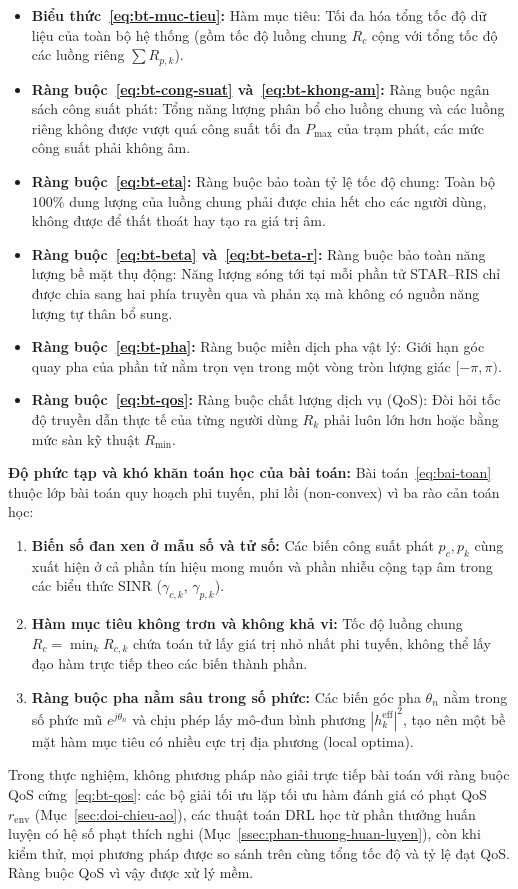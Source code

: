 \begin{itemize}
\item \textbf{Biểu thức~\eqref{eq:bt-muc-tieu}:} Hàm mục tiêu: Tối đa hóa tổng tốc độ dữ liệu của toàn bộ hệ
  thống (gồm tốc độ luồng chung $R_c$ cộng với tổng tốc độ các luồng riêng $\sum R_{p,k}$).
\item \textbf{Ràng buộc~\eqref{eq:bt-cong-suat} và~\eqref{eq:bt-khong-am}:} Ràng buộc ngân sách công suất
  phát: Tổng năng lượng phân bổ cho luồng chung và các luồng riêng không được vượt quá công suất tối đa
  $P_{\max}$ của trạm phát, các mức công suất phải không âm.
\item \textbf{Ràng buộc~\eqref{eq:bt-eta}:} Ràng buộc bảo toàn tỷ lệ tốc độ chung: Toàn bộ $100\%$ dung lượng
  của luồng chung phải được chia hết cho các người dùng, không được để thất thoát hay tạo ra giá trị âm.
\item \textbf{Ràng buộc~\eqref{eq:bt-beta} và~\eqref{eq:bt-beta-r}:} Ràng buộc bảo toàn năng lượng bề mặt
  thụ động: Năng lượng sóng tới tại mỗi phần tử STAR--RIS chỉ được chia sang hai phía truyền qua và phản xạ mà
  không có nguồn năng lượng tự thân bổ sung.
\item \textbf{Ràng buộc~\eqref{eq:bt-pha}:} Ràng buộc miền dịch pha vật lý: Giới hạn góc quay pha của phần tử
  nằm trọn vẹn trong một vòng tròn lượng giác $[-\pi, \pi)$.
\item \textbf{Ràng buộc~\eqref{eq:bt-qos}:} Ràng buộc chất lượng dịch vụ (QoS): Đòi hỏi tốc độ truyền dẫn
  thực tế của từng người dùng $R_k$ phải luôn lớn hơn hoặc bằng mức sàn kỹ thuật $R_{\min}$.
\end{itemize}

\textbf{Độ phức tạp và khó khăn toán học của bài toán:} Bài toán~\eqref{eq:bai-toan} thuộc lớp bài toán quy
hoạch phi tuyến, phi lồi (non-convex) vì ba rào cản toán học:
\begin{enumerate}
\item \textbf{Biến số đan xen ở mẫu số và tử số:} Các biến công suất phát $p_c, p_k$ cùng xuất hiện ở cả phần
  tín hiệu mong muốn và phần nhiễu cộng tạp âm trong các biểu thức SINR ($\gamma_{c,k}$, $\gamma_{p,k}$).
\item \textbf{Hàm mục tiêu không trơn và không khả vi:} Tốc độ luồng chung $R_c = \min_k R_{c,k}$ chứa toán tử
  lấy giá trị nhỏ nhất phi tuyến, không thể lấy đạo hàm trực tiếp theo các biến thành phần.
\item \textbf{Ràng buộc pha nằm sâu trong số phức:} Các biến góc pha $\theta_n$ nằm trong số phức mũ
  $e^{j\theta_n}$ và chịu phép lấy mô-đun bình phương $|h^{\mathrm{eff}}_k|^2$, tạo nên một bề mặt hàm mục
  tiêu có nhiều cực trị địa phương (local optima).
\end{enumerate}
Trong thực nghiệm, không phương pháp nào giải trực tiếp bài toán với ràng buộc QoS cứng~\eqref{eq:bt-qos}:
các bộ giải tối ưu lặp tối ưu hàm đánh giá có phạt QoS $r_{\mathrm{env}}$ (Mục~\ref{sec:doi-chieu-ao}), các
thuật toán DRL học từ phần thưởng huấn luyện có hệ số phạt thích nghi (Mục~\ref{ssec:phan-thuong-huan-luyen}),
còn khi kiểm thử, mọi phương pháp được so sánh trên cùng tổng tốc độ và tỷ lệ đạt QoS. Ràng buộc QoS vì vậy
được xử lý mềm.

